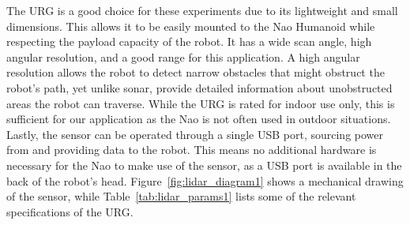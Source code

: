 The URG is a good choice for these experiments due to its lightweight and small
dimensions. This allows it to be easily mounted to the Nao Humanoid while
respecting the payload capacity of the robot. It has a wide scan angle, high
angular resolution, and a good range for this application. A high angular
resolution allows the robot to detect narrow obstacles that might obstruct the
robot's path, yet unlike sonar, provide detailed information about unobstructed
areas the robot can traverse. While the URG is rated for indoor use only, this
is sufficient for our application as the Nao is not often used in outdoor 
situations. Lastly, the sensor can be operated through a single USB port,
sourcing power from and providing data to the robot. This means no additional hardware is 
necessary for the Nao to make use of the sensor, as a USB port is available
in the back of the robot's head.
Figure~\ref{fig:lidar_diagram1} shows a mechanical drawing of the sensor, while
Table~\ref{tab:lidar_params1} lists some of the relevant specifications of the
URG.

